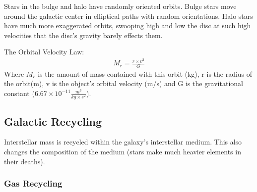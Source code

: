 \documentclass[12pt]{article}
\begin{document}
Stars in the bulge and halo have randomly oriented orbits. Bulge stars move around the galactic center in elliptical paths with random orientations. Halo stars have much more exaggerated orbits, swooping high and low the disc at such high velocities that the disc's gravity barely effects them.

The Orbital Velocity Law:\\
\begin{align*}
    M_r = \frac{r \times v^2}{G}
\end{align*}
Where $M_r$ is the amount of mass contained with this orbit (kg), r is the radius of the orbit(m), v is the object's orbital velocity (m/s) and G is the gravitational constant ($6.67\times 10^{-11} \frac{m^3}{kg \times s^2}$).

\subsection{Galactic Recycling}
Interstellar mass is recycled within the galaxy's interstellar medium. This also changes the composition of the medium (stars make much heavier elements in their deaths).

\subsubsection{Gas Recycling}
\end{document}
